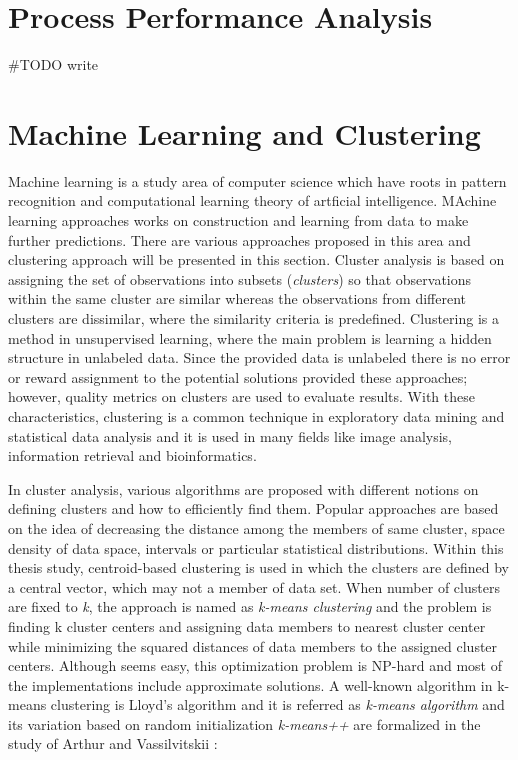 \section{Process Performance Analysis}
\label{sec:process-performance-analysis}
#TODO write

\section{Machine Learning and Clustering}
\label{sec:unsupervised-learning}
Machine learning is a study area of computer science which have roots in pattern recognition and computational learning theory of artficial intelligence. MAchine learning approaches works on construction and learning from data to make further predictions. There are various approaches proposed in this area and clustering approach will be presented in this section. Cluster analysis is based on assigning the set of observations into subsets (\textit{clusters}) so that observations within the same cluster are similar whereas the observations from different clusters are dissimilar, where the similarity criteria is predefined. Clustering is a method in unsupervised learning, where the main problem is learning a hidden structure in unlabeled data. Since the provided data is unlabeled there is no error or reward assignment to the potential solutions provided these approaches; however, quality metrics on clusters are used to evaluate results. With these characteristics, clustering is a common technique in exploratory data mining and statistical data analysis and it is used in many fields like image analysis, information retrieval and bioinformatics.

In cluster analysis, various algorithms are proposed with different notions on defining clusters and how to efficiently find them. Popular approaches are based on the idea of decreasing the distance among the members of same cluster, space density of data space, intervals or particular statistical distributions. Within this thesis study, centroid-based clustering is used in which the clusters are defined by a central vector, which may not a member of data set. When number of clusters are fixed to \textit{k}, the approach is named as \textit{k-means clustering} and the problem is finding k cluster centers and assigning data members to nearest cluster center while minimizing the squared distances of data members to the assigned cluster centers. Although seems easy, this optimization problem is NP-hard and most of the implementations include approximate solutions. A well-known algorithm in k-means clustering is Lloyd's algorithm and it is referred as \textit{k-means algorithm} and its variation based on random initialization \textit{k-means++} are formalized in the study of Arthur and Vassilvitskii \cite{arthur2007}:
 
